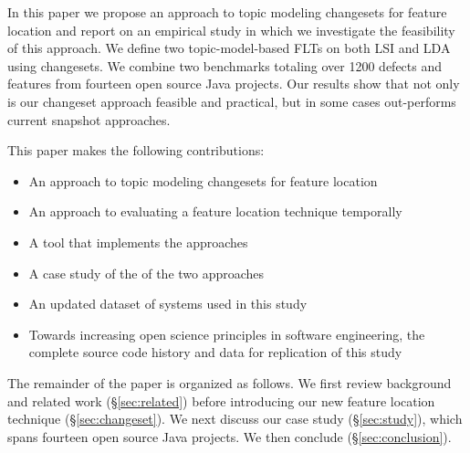 In this paper we propose an approach to topic modeling changesets for feature location
and report on an empirical study in which we investigate the feasibility of this approach.
We define two topic-model-based FLTs on both LSI and LDA using changesets.
We combine two benchmarks totaling over 1200 defects and features from fourteen open source Java projects.
Our results show that not only is our changeset approach feasible and practical,
but in some cases out-performs current snapshot approaches.


This paper makes the following contributions:

\begin{itemize}
    \item An approach to topic modeling changesets for feature location
    \item An approach to evaluating a feature location technique temporally
    \item A tool that implements the approaches
    \item A case study of the of the two approaches
    \item An updated dataset of systems used in this study
    \item Towards increasing open science principles in software engineering,
        the complete source code history and data for replication of this study
\end{itemize}

The remainder of the paper is organized as follows.
We first review background and related work (\S\ref{sec:related})
before introducing our new feature location technique (\S\ref{sec:changeset}).
We next discuss our case study (\S\ref{sec:study}), which spans fourteen open source Java projects. %
We then conclude (\S\ref{sec:conclusion}).

